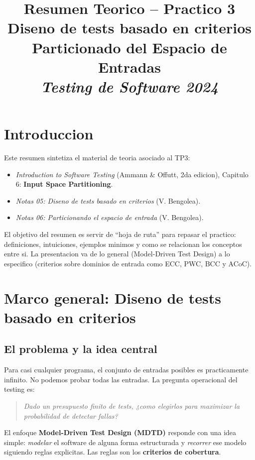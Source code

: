 \documentclass[12pt,a4paper]{article}
\title{\textbf{Resumen Teorico -- Practico 3}\\
Diseno de tests basado en criterios\\
Particionado del Espacio de Entradas\\
\textit{Testing de Software 2024}}
\author{}
\date{}
\begin{document}
\maketitle
\tableofcontents
\newpage

\section*{Introduccion}

Este resumen sintetiza el material de teoria asociado al TP3:

\begin{itemize}
  \item \textit{Introduction to Software Testing} (Ammann \& Offutt, 2da edicion), Capitulo 6:
  \textbf{Input Space Partitioning}.
  \item \textit{Notas 05: Diseno de tests basado en criterios} (V. Bengolea).
  \item \textit{Notas 06: Particionando el espacio de entrada} (V. Bengolea).
\end{itemize}

El objetivo del resumen es servir de ``hoja de ruta'' para repasar el practico: definiciones,
intuiciones, ejemplos minimos y como se relacionan los conceptos entre si. La presentacion va de
lo general (Model-Driven Test Design) a lo especifico (criterios sobre dominios de entrada como
ECC, PWC, BCC y ACoC).

\section{Marco general: Diseno de tests basado en criterios}

\subsection{El problema y la idea central}

Para casi cualquier programa, el conjunto de entradas posibles es practicamente infinito. No podemos
probar todas las entradas. La pregunta operacional del testing es:

\begin{quote}
\textit{Dado un presupuesto finito de tests, ¿como elegirlos para maximizar la probabilidad de
detectar fallas?}
\end{quote}

El enfoque \textbf{Model-Driven Test Design (MDTD)} responde con una idea simple: \emph{modelar} el
software de alguna forma estructurada y \emph{recorrer} ese modelo siguiendo reglas explicitas. Las
reglas son los \textbf{criterios de cobertura}.
\end{document}

